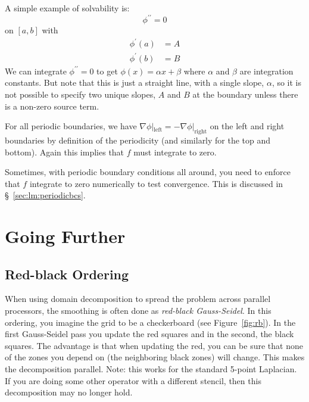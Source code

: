 A simple example of solvability is:
\begin{equation}
\phi^{\prime\prime} = 0
\end{equation}
on $[a, b]$ with 
\begin{align}
\phi^\prime(a) &= A \\
\phi^\prime(b) &= B
\end{align}
We can integrate $\phi^{\prime\prime} = 0$ to get $\phi(x) = \alpha x
+ \beta$ where $\alpha$ and $\beta$ are integration constants.  But
note that this is just a straight line, with a single slope, $\alpha$,
so it is not possible to specify two unique slopes, $A$ and $B$ at the
boundary unless there is a non-zero source term.

For all periodic boundaries, we have $\nabla \phi
|_\mathrm{left} = -\nabla \phi |_\mathrm{right}$ on the left and right
boundaries by definition of the periodicity (and similarly for the top
and bottom).  Again this implies that $f$ must integrate to zero.

Sometimes, with periodic boundary conditions all around, you need to
enforce that $f$ integrate to zero numerically to test convergence.
This is discussed in \S~\ref{sec:lm:periodicbcs}.



\section{Going Further}

\label{sec:multigrid:other}

\subsection{Red-black Ordering}

When using domain decomposition to spread the problem across parallel
processors, the smoothing is often done as {\em red-black
  Gauss-Seidel}.  In this ordering, you imagine the grid to be a
checkerboard (see Figure~\ref{fig:rb}).  In the first Gauss-Seidel
pass you update the red squares and in the second, the black squares.
The advantage is that when updating the red, you can be sure that none
of the zones you depend on (the neighboring black zones) will change.
This makes the decomposition parallel.  Note: this works for the
standard 5-point Laplacian.  If you are doing some other operator with
a different stencil, then this decomposition may no longer hold.

